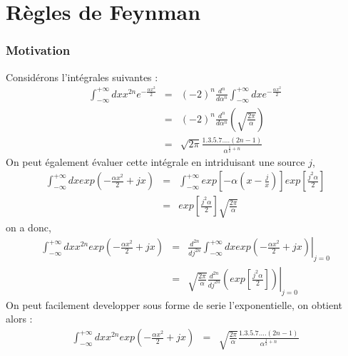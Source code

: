 \documentclass[a4paper,11pt]{article} %
\theoremstyle{plain}
\theoremstyle{definition}
\theoremstyle{remark}
\numberwithin{equation}{section}
\numberwithin{equation}{subsection}
\numberwithin{figure}{section}
\begin{document}
\section{Règles de Feynman}

    \subsubsection{Motivation}


\noindent
Considérons l'intégrales suivantes :
\begin{eqnarray*}
 \int_{-\infty}^{+\infty} dx x^{2n} e^{- \frac{\alpha x^2}{2} }  &=& (-2)^{n} \frac{d^{n}}{d \alpha^{n}}  \int_{-\infty}^{+\infty} dx  
e^{- \frac{\alpha x^2}{2} }  \\
                                                                 &=& (-2)^{n} \frac{d^{n}}{d \alpha^{n}} \left( \sqrt{\frac{2 \pi}{\alpha}} \right) \\
                                                                 &=&  \sqrt{2 \pi}  \frac{1.3.5.7.  ... (2n-1)}{\alpha^{\frac{1}{2}+n}}
\end{eqnarray*}
On peut également évaluer cette intégrale en intriduisant une source $j$,
\begin{eqnarray*}
 \int_{-\infty}^{+\infty} dx  exp \left( - \frac{\alpha x^2}{2}  +j x \right) &=&  \int_{-\infty}^{+\infty}  
exp \left [ -\alpha \left( x- \frac{j}{x} \right) \right ] exp \left [ \frac{j^2 \alpha}{2} \right ]  \\
                                                                              &=&  exp \left [ \frac{j^2 \alpha}{2} \right ]   
\sqrt{\frac{2 \pi}{\alpha}}
\end{eqnarray*}
on a donc,
\begin{eqnarray*}
  \int_{-\infty}^{+\infty} dx  x^{2n}  exp \left( - \frac{\alpha x^2}{2}  +j x \right) &=& \left.  \frac{d^{2n}}{d j^{2n}}  
\int_{-\infty}^{+\infty} dx  exp \left( - \frac{\alpha x^2}{2}  +j x \right) \right |_{j=0} \\
                                                                                       &=&  \left.  \sqrt{\frac{2 \pi}{\alpha}}  
\frac{d^{2n}}{d j^{2n}}  \left( exp \left [ \frac{j^2 \alpha}{2} \right ]   \right)   \right |_{j=0}
\end{eqnarray*}
On peut facilement developper sous forme de serie l'exponentielle, on obtient alors :
\begin{eqnarray*}
  \int_{-\infty}^{+\infty} dx  x^{2n}  exp \left( - \frac{\alpha x^2}{2}  +j x \right) &=&   \sqrt{\frac{2 \pi}{\alpha}}  
\frac{1.3.5.7.  ...  (2n-1)}{\alpha ^{\frac{1}{2}+n}}
\end{eqnarray*}
\end{document}
